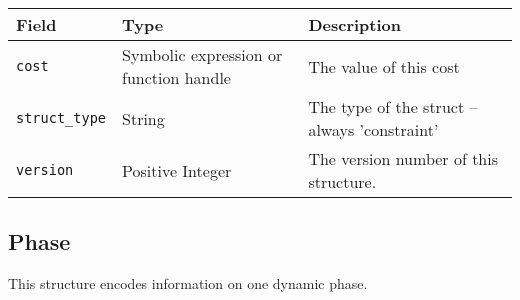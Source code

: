 \documentclass{article}
\begin{document}
			\begin{tabular}{ p{} | p{} | p{152pt}}
				Field                    & Type                             & Description                                    \\ \hline
				\lstinline|cost|         & \raggedright Symbolic expression or function handle
				                                                            & The value of this cost                         \\[4ex]
				\lstinline|struct_type|  & String                           & The type of the struct -- always 'constraint'  \\[1ex]
				\lstinline|version|      & \raggedright Positive Integer    & The version number of this structure.
			\end{tabular}

		\subsection{Phase}
			\label{sec:phase} %

			This structure encodes information on one dynamic phase.

			\vspace{\baselineskip}
\end{document}
